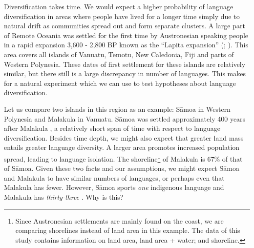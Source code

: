 \documentclass[a4paper,10pt]{article} %
\begin{document}


Diversification takes time. We would expect a higher probability of language diversification in areas where people have lived for a longer time simply due to natural drift as communities spread out and form separate clusters. A large part of Remote Oceania was settled for the first time by Austronesian speaking people in a rapid expansion 3,600 - 2,800 BP known as the ``Lapita expansion'' (\citet[106-7]{bellwood2006austronesians}; \citet[137]{rieth_cochrane_2018}). This area covers all islands of Vanuatu, Temotu, New Caledonia, Fiji and parts of Western Polynesia. These dates of first settlement for these islands are relatively similar, but there still is a large discrepancy in number of languages. This makes for a natural experiment which we can use to test hypotheses about language diversification.

Let us compare two islands in this region as an example: S\={a}moa in Western Polynesia and Malakula in Vanuatu. S\={a}moa was settled approximately 400 years after Malakula  \citep[137-8]{rieth_cochrane_2018}, a relatively short span of time with respect to language diversification. Besides time depth, we might also expect that greater land mass entails greater language diversity. A larger area promotes increased population spread, leading to language isolation. The shoreline\footnote{Since Austronesian settlements are mainly found on the coast, we are comparing shorelines instead of land area in this example. The data of this study contains information on land area, land area + water; and shoreline.} of Malakula is 67\% of that of S\={a}moa. Given these two facts and our assumptions, we might expect S\={a}moa and Malakula to have similar numbers of languages, or perhaps even that Malakula has fewer. However, S\={a}moa sports \emph{one} indigenous language and Malakula has \emph{thirty-three} \citep{glottolog40}. Why is this?

\end{document}
